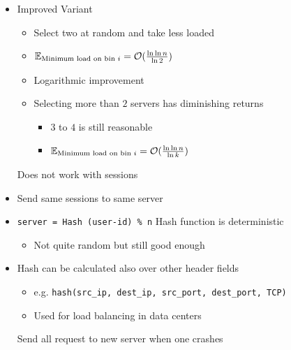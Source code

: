 \begin{itemize}
\begin{itemize}
\begin{itemize}
\begin{itemize}
                        \end{itemize}
                    \item Improved Variant
                        \begin{itemize}
                            \item Select two at random and take less loaded
                            \item $\mathbb{E}_{\text{Minimum load on bin } i} = \mathcal{O}(\frac{\ln \ln n}{\ln 2})$
                            \item Logarithmic improvement
                            \item Selecting more than $2$ servers has diminishing returns
                                \begin{itemize}
                                    \item $3$ to $4$ is still reasonable
                                    \item $\mathbb{E}_{\text{Minimum load on bin } i} = \mathcal{O}(\frac{\ln \ln n}{\ln k})$
                                \end{itemize}
                        \end{itemize}
                    \icon Does not work with sessions
                \end{itemize}
                \begin{itemize}
                    \item Send same sessions to same server
                    \item \verb+server = Hash (user-id) % n+
                    \icon Hash function is deterministic
                        \begin{itemize}
                            \item Not quite random but still good enough
                        \end{itemize}
                    \item Hash can be calculated also over other header fields
                        \begin{itemize}
                            \item e.g. \verb+hash(src_ip, dest_ip, src_port, dest_port, TCP)+
                            \item Used for load balancing in data centers
                        \end{itemize}
                    \icon Send all request to new server when one crashes

\end{itemize}
\end{itemize}
\end{itemize}
